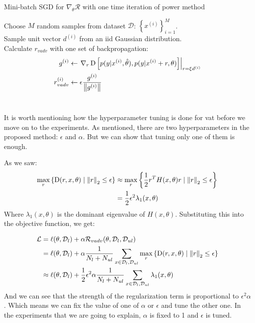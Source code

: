 \documentclass[paper=a4, fontsize=11pt]{scrartcl}
\numberwithin{equation}{section}		%
\numberwithin{figure}{section}			%
\numberwithin{table}{section}				%
\begin{document}
\begin{algorithm}
\label{alg:vat_k1}
\caption{Mini-batch SGD for \(\nabla_\theta\mathcal{R}\) with one time iteration of power method}
Choose \(M\) random samples from dataset \(\mathcal{D}\): \(\left\{x^{(i)}\right\}_{i=1}^M\).\\
Sample unit vector \(d^{(i)}\) from an iid Gaussian distribution.\\
Calculate \(r_{vadv}\) with one set of backpropagation:
\begin{align*}
g^{(i)} &\gets \left.\nabla_r \operatorname*{D} \left[p(y | x^{(i)}, \hat{\theta}), p(y | x^{(i)} + r, \theta)\right]\right|_{r=\xi d^{(i)}}\\
r_{vadv}^{(i)} &\gets \epsilon \frac{g^{(i)}}{\left\lVert g^{(i)}\right\rVert}
\end{align*}\\
\end{algorithm}

It is worth mentioning how the hyperparameter tuning is done for vat before we move on to the experiments.
As mentioned, there are two hyperparameters in the proposed method: \(\epsilon\) and \(\alpha\).
But we can show that tuning only one of them is enough.

As we saw:
\begin{align}
\max_r\left\{ \operatorname*{D}(r, x, \theta) \mid \left\lVert r\right\rVert_2 \le \epsilon\right\} & \approx \max_r\left\{\frac{1}{2} r^T H(x, \theta)r \mid \left\lVert r\right\rVert_2 \le \epsilon\right\}\\
& = \frac{1}{2} \epsilon^2 \lambda_1(x, \theta)
\end{align}
Where \(\lambda_1(x, \theta)\) is the dominant eigenvalue of \(H(x, \theta)\).
Substituting this into the objective function, we get:

\begin{align}
\mathcal{L} &= \ell(\theta, \mathcal{D}_l) + \alpha \mathcal{R}_{vadv} (\theta, \mathcal{D}_l, \mathcal{D}_{ul})\\
&= \ell(\theta, \mathcal{D}_l) + \alpha \frac{1}{N_l + N_{ul}} \sum_{x \in \mathcal{D}_l, \mathcal{D}_{ul}} \max_r\left\{ \operatorname*{D}(r, x, \theta) \mid \left\lVert r\right\rVert_2 \le \epsilon\right\}\\
& \approx \ell(\theta, \mathcal{D}_l) + \frac{1}{2} \epsilon^2\alpha \frac{1}{N_l + N_{ul}} \sum_{x \in \mathcal{D}_l, \mathcal{D}_{ul}}  \lambda_1(x, \theta)
\end{align}
And we can see that the strength of the regularization term is proportional to \(\epsilon^2\alpha\).
Which means we can fix the value of one of \(\alpha\) or \(\epsilon\) and tune the other one.
In the experiments that we are going to explain, \(\alpha\) is fixed to 1 and \(\epsilon\) is tuned.
\end{document}
